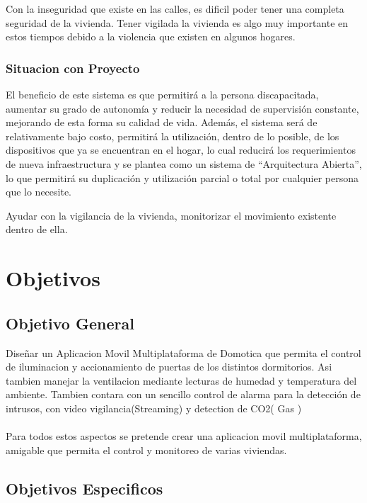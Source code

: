 \documentclass[letterpaper,12pt]{article}
\begin{document}
{		Con la inseguridad que existe en las calles, es dificil poder tener una completa seguridad de la vivienda.
		Tener vigilada la vivienda es algo muy importante en estos tiempos debido a la violencia que existen en algunos hogares.
		
		\subsubsection{Situacion con Proyecto}
		El beneficio de este sistema es que permitirá a la persona discapacitada, aumentar su grado de autonomía y reducir la necesidad de supervisión constante, mejorando de esta forma su calidad de vida.  Además, el sistema será de relativamente bajo costo, permitirá la utilización, dentro de lo posible, de los dispositivos que ya se encuentran en el hogar, lo cual reducirá los requerimientos de nueva infraestructura y se plantea como un sistema de “Arquitectura Abierta”, lo que permitirá su duplicación y  utilización parcial o total por cualquier persona que lo necesite. 
		
		Ayudar con la vigilancia de la vivienda, monitorizar el movimiento existente dentro de ella.
		
		
		\section{Objetivos}
		
		
		
		
		\subsection{Objetivo General}
		
		Diseñar un Aplicacion Movil Multiplataforma de Domotica que permita el control de  iluminacion y accionamiento de puertas de los distintos dormitorios.
		Asi tambien manejar la ventilacion mediante lecturas de humedad y temperatura del ambiente. Tambien contara con un sencillo control de alarma para la detección de intrusos, con video vigilancia(Streaming)  y detection de CO2( Gas )\\\\
		Para todos estos aspectos se pretende crear una aplicacion movil multiplataforma, amigable que permita el control y monitoreo de varias viviendas.
		
		
		\subsection{Objetivos Especificos}
		
}
\end{document}
